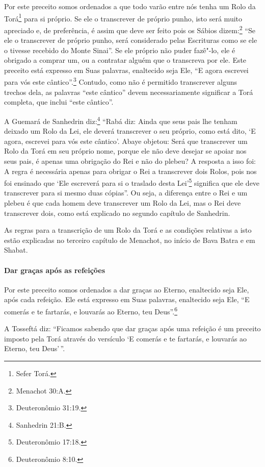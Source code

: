\begin{multicols}{2}
Por este preceito somos ordenados a que todo varão entre nós tenha um Rolo da Torá\starr\footnote{Sefer Torá\starr.} para si próprio. Se ele o transcrever de próprio punho, isto será muito apreciado e, de preferência, é assim que deve ser feito
pois os Sábios dizem:\footnote{Menachot\starr{} 30:A.} ``Se ele o transcrever de
próprio punho, será considerado pelas Escrituras como se ele o tivesse recebido do Monte Sinai''. Se ele
próprio não puder fazê"-lo, ele é obrigado a comprar um, ou a contratar
alguém que o transcreva por ele. Este preceito está expresso em Suas palavras,
enaltecido seja Ele, ``E agora escrevei para vós este cântico''.\footnote{Deuteronômio 31:19.} Contudo, como não é permitido transcrever alguns
trechos dela, as palavras ``este cântico'' devem necessariamente
significar a Torá\starr{} completa, que inclui ``este cântico''.

A Guemará\starr{} de Sanhedrin\starr{} diz:\footnote{Sanhedrin\starr{} 21:B.} ``Rabá\starr{} diz: Ainda que
seus pais lhe tenham deixado um Rolo da Lei, ele deverá transcrever o seu próprio,
como está dito, `E agora, escrevei para vós este cântico'. Abaye
objetou: Será que transcrever um Rolo da Torá\starr{} em seu próprio nome,
porque ele não deve desejar se apoiar nos seus pais, é apenas uma
obrigação do Rei e não do plebeu? A resposta a isso foi: A regra é
necessária apenas para obrigar o Rei a transcrever dois Rolos, pois nos
foi ensinado que `Ele escreverá para si o traslado desta Lei'\footnote{Deuteronômio 17:18.} significa que ele deve transcrever para si mesmo
duas cópias''. Ou seja, a diferença entre o Rei e um plebeu é que cada
homem deve transcrever um Rolo da Lei, mas o Rei deve transcrever dois,
como está explicado no segundo capítulo de Sanhedrin\starr.

As regras para a transcrição de um Rolo da Torá\starr{} e as condições
relativas a isto estão explicadas no terceiro capítulo de Menachot\starr, no
início de Bava Batra\starr{} e em Shabat.

\paragraph{Dar graças após as refeições}

Por este preceito somos ordenados a dar graças ao Eterno, enaltecido
seja Ele, após cada refeição. Ele está expresso em Suas palavras,
enaltecido seja Ele, ``E comerás e te fartarás, e louvarás ao Eterno,
teu Deus''.\footnote{Deuteronômio 8:10.}

A Tosseftá\starr{} diz: ``Ficamos sabendo que dar graças após uma refeição é um
preceito imposto pela Torá\starr{} através do versículo `E comerás e te
fartarás, e louvarás ao Eterno, teu Deus'\,''.


\end{multicols}
